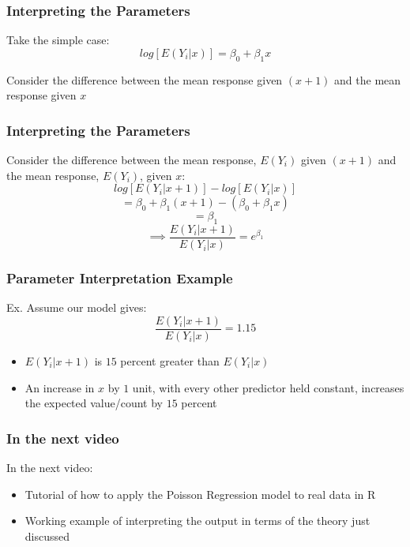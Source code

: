 \documentclass{beamer}
\begin{document}
\begin{frame}[fragile]\frametitle{Interpreting the Parameters}	
	
	Take the simple case: $$ log[E(Y_i|x)] = \beta_0 + \beta_1 x $$

	Consider the difference between the mean response given $(x+1)$ and the mean response given $x$
	
\end{frame}



\begin{frame}[fragile]\frametitle{Interpreting the Parameters}

	Consider the difference between the mean response, $E(Y_i)$ given $(x+1)$ and the mean response, $E(Y_i)$, given $x$:
	$$ log[E(Y_i|x+1)] - log[E(Y_i|x)] $$
	$$ = \beta_0 + \beta_1 (x + 1) - (\beta_0 + \beta_1 x)$$ 
	$$ = \beta_1 $$
	$$ \implies \frac{E(Y_i|x+1)}{E(Y_i|x)} = e^{\beta_1} $$

\end{frame}



\begin{frame}[fragile]\frametitle{Parameter Interpretation Example}
	
	Ex. Assume our model gives: $$ \frac{E(Y_i|x+1)}{E(Y_i|x)} = 1.15 $$
	
	\begin{itemize}
	
		\item $E(Y_i|x+1)$ is $15$ percent greater than $E(Y_i|x)$
		
		\item An increase in $x$ by $1$ unit, with every other predictor held constant, increases the expected value/count by $15$ percent
	
	\end{itemize}
	
\end{frame}



\begin{frame}[fragile]\frametitle{In the next video}
	
	In the next video:	
	
	\begin{itemize}
	
		\item Tutorial of how to apply the Poisson Regression model to real data in R
		
		\item Working example of interpreting the output in terms of the theory just discussed
		
	\end{itemize}
	
\end{frame}
\end{document}
